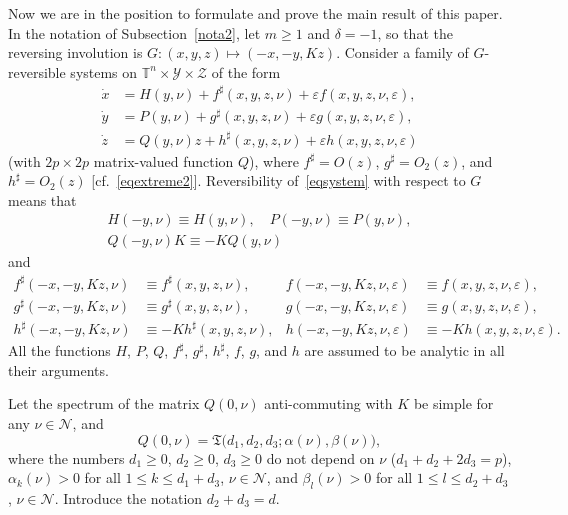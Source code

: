 \documentclass[12pt,reqno]{amsart}
\theoremstyle{definition}
\begin{document}
Now we are in the position to formulate and prove the main result of this
paper. In the notation of Subsection~\ref{nota2}, let $m{\geqslant} 1$ and
$\delta=-1$, so that the reversing involution is $G:(x,y,z)\mapsto(-x,-y,Kz)$.
Consider a family of $G$-reversible systems on ${\mathbb T}^n\times{\mathcal Y}\times{\mathcal Z}$ of
the form
\begin{equation}
\begin{aligned}
\dot{x} &= H(y,\nu)+f^\sharp(x,y,z,\nu)+{\varepsilon} f(x,y,z,\nu,{\varepsilon}), \\
\dot{y} &= P(y,\nu)+g^\sharp(x,y,z,\nu)+{\varepsilon} g(x,y,z,\nu,{\varepsilon}), \\
\dot{z} &= Q(y,\nu)z+h^\sharp(x,y,z,\nu)+{\varepsilon} h(x,y,z,\nu,{\varepsilon})
\end{aligned}
\label{eqsystem}
\end{equation}
(with $2p\times 2p$ matrix-valued function $Q$), where $f^\sharp=O(z)$,
$g^\sharp=O_2(z)$, and $h^\sharp=O_2(z)$ [cf.~\eqref{eqextreme2}].
Reversibility of~\eqref{eqsystem} with respect to $G$ means that
\begin{gather*}
H(-y,\nu)\equiv H(y,\nu), \quad P(-y,\nu)\equiv P(y,\nu), \\
Q(-y,\nu)K\equiv-KQ(y,\nu)
\end{gather*}
and
\begin{align*}
f^\sharp(-x,-y,Kz,\nu) &\equiv f^\sharp(x,y,z,\nu), &
f(-x,-y,Kz,\nu,{\varepsilon}) &\equiv f(x,y,z,\nu,{\varepsilon}), \\
g^\sharp(-x,-y,Kz,\nu) &\equiv g^\sharp(x,y,z,\nu), &
g(-x,-y,Kz,\nu,{\varepsilon}) &\equiv g(x,y,z,\nu,{\varepsilon}), \\
h^\sharp(-x,-y,Kz,\nu) &\equiv -Kh^\sharp(x,y,z,\nu), &
h(-x,-y,Kz,\nu,{\varepsilon}) &\equiv -Kh(x,y,z,\nu,{\varepsilon}).
\end{align*}
All the functions $H$, $P$, $Q$, $f^\sharp$, $g^\sharp$, $h^\sharp$, $f$, $g$,
and $h$ are assumed to be analytic in all their arguments.

Let the spectrum of the matrix $Q(0,\nu)$ anti-commuting with $K$ be simple
for any $\nu\in{\mathcal N}$, and
\[
Q(0,\nu)={\mathfrak T}\bigl(d_1,d_2,d_3;\alpha(\nu),\beta(\nu)\bigr),
\]
where the numbers $d_1{\geqslant} 0$, $d_2{\geqslant} 0$, $d_3{\geqslant} 0$ do not depend on $\nu$
($d_1+d_2+2d_3=p$), $\alpha_k(\nu)>0$ for all $1{\leqslant} k{\leqslant} d_1+d_3$,
$\nu\in{\mathcal N}$, and $\beta_l(\nu)>0$ for all $1{\leqslant} l{\leqslant} d_2+d_3$, $\nu\in{\mathcal N}$.
Introduce the notation $d_2+d_3=d$.
\end{document}
